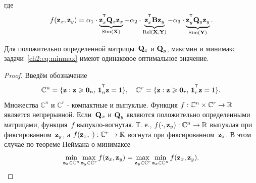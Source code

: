 где
\begin{equation*}
f(\bz_x, \bz_y) = \alpha_1 \cdot \underbrace{\bz_x^{\T} \bQ_x \bz_x}_{\text{Sim}(\bX)} - \alpha_2 \cdot \underbrace{\bz_x^{\T} \bB \bz_y}_{\text{Rel}(\bX, \bY)} - \alpha_3 \cdot \underbrace{\bz_y^{\T} \bQ_y \bz_y}_{\text{Sim}(\bY)}.
\end{equation*}
\begin{theorem}
	Для положительно определенной матрицы~$\mathbf{Q}_x$ и $\mathbf{Q}_y$, максмин и минимакс задачи~\eqref{ch2:eq:minmax} имеют одинаковое оптимальное значение.
\end{theorem}
\begin{proof}
	Введём обозначение
	\begin{equation*}
	\mathbb{C}^n = \{\bz : \bz \geq \bZero_n, \, \bOne_n^{\T}\bz=1\}, \quad \mathbb{C}^r = \{\bz : \bz \geq \bZero_r, \, \bOne_r^{\T}\bz=1\}.
	\end{equation*}
	Множества $\mathbb{C}^n$ и $\mathbb{C}^r$ - компактные и выпуклые. Функция $f: \mathbb{C}^n \times \mathbb{C}^r \rightarrow \mathbb{R}$ является непрерывной. Если~$\mathbf{Q}_x$ и $\mathbf{Q}_y$ являются положительно определенными матрицами, функция~$f$ выпукло-вогнутая. Т. е.,
	$f(\cdot, \mathbf{z}_y): \mathbb{C}^n \rightarrow \mathbb{R}$ выпуклая при фиксированном~$\mathbf{z}_y$, а $f(\mathbf{z}_x, \cdot): \mathbb{C}^r \rightarrow \mathbb{R}$ вогнута при фиксированном~$\mathbf{z}_x$.
	В этом случае по теореме Неймана о минимаксе
	\begin{equation*}
	\min_{\mathbf{z}_x \in \mathbb{C}^n} \max_{\mathbf{z}_y \in \mathbb{C}^r} f(\mathbf{z}_x, \mathbf{z}_y) = \max_{\mathbf{z}_y \in \mathbb{C}^r} \min_{\mathbf{z}_x\in \mathbb{C}^n} f(\mathbf{z}_x, \mathbf{z}_y).
	\end{equation*}
\end{proof}


